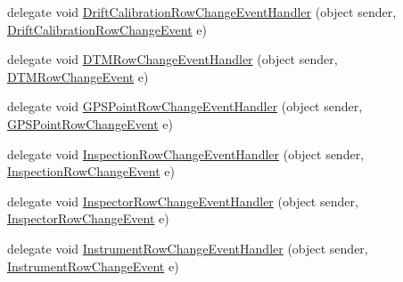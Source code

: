 \begin{DoxyCompactItemize}
\item 
delegate void \hyperlink{class_env_int_1_1_win32_1_1_field_tech_1_1_manager_1_1_data_sets_1_1_guide_ware_mobile_data_set_a74711d801985d4a45cabf719e45510fc}{Drift\+Calibration\+Row\+Change\+Event\+Handler} (object sender, \hyperlink{class_env_int_1_1_win32_1_1_field_tech_1_1_manager_1_1_data_sets_1_1_guide_ware_mobile_data_set_aa92b3413cef1716fa2c99ea466ba9d7}{Drift\+Calibration\+Row\+Change\+Event} e)
\item 
delegate void \hyperlink{class_env_int_1_1_win32_1_1_field_tech_1_1_manager_1_1_data_sets_1_1_guide_ware_mobile_data_set_abe0bdf2a1603396d939e3b7d67751cd0}{D\+T\+M\+Row\+Change\+Event\+Handler} (object sender, \hyperlink{class_env_int_1_1_win32_1_1_field_tech_1_1_manager_1_1_data_sets_1_1_guide_ware_mobile_data_set_1_1_d_t_m_row_change_event}{D\+T\+M\+Row\+Change\+Event} e)
\item 
delegate void \hyperlink{class_env_int_1_1_win32_1_1_field_tech_1_1_manager_1_1_data_sets_1_1_guide_ware_mobile_data_set_a5ace8b260a4d9a8220395bb6e8bf5c0f}{G\+P\+S\+Point\+Row\+Change\+Event\+Handler} (object sender, \hyperlink{class_env_int_1_1_win32_1_1_field_tech_1_1_manager_1_1_data_sets_1_1_guide_ware_mobile_data_set_baf5953e40523560f37c87dac2e88271}{G\+P\+S\+Point\+Row\+Change\+Event} e)
\item 
delegate void \hyperlink{class_env_int_1_1_win32_1_1_field_tech_1_1_manager_1_1_data_sets_1_1_guide_ware_mobile_data_set_ae19b5244eb5bea018bbc498378447759}{Inspection\+Row\+Change\+Event\+Handler} (object sender, \hyperlink{class_env_int_1_1_win32_1_1_field_tech_1_1_manager_1_1_data_sets_1_1_guide_ware_mobile_data_set_1_1_inspection_row_change_event}{Inspection\+Row\+Change\+Event} e)
\item 
delegate void \hyperlink{class_env_int_1_1_win32_1_1_field_tech_1_1_manager_1_1_data_sets_1_1_guide_ware_mobile_data_set_aeddc5131b501c25321fe024d37442034}{Inspector\+Row\+Change\+Event\+Handler} (object sender, \hyperlink{class_env_int_1_1_win32_1_1_field_tech_1_1_manager_1_1_data_sets_1_1_guide_ware_mobile_data_set_1_1_inspector_row_change_event}{Inspector\+Row\+Change\+Event} e)
\item 
delegate void \hyperlink{class_env_int_1_1_win32_1_1_field_tech_1_1_manager_1_1_data_sets_1_1_guide_ware_mobile_data_set_ad940ee36693fa300fc3113b12a98fef3}{Instrument\+Row\+Change\+Event\+Handler} (object sender, \hyperlink{class_env_int_1_1_win32_1_1_field_tech_1_1_manager_1_1_data_sets_1_1_guide_ware_mobile_data_set_1_1_instrument_row_change_event}{Instrument\+Row\+Change\+Event} e)

\end{DoxyCompactItemize}
